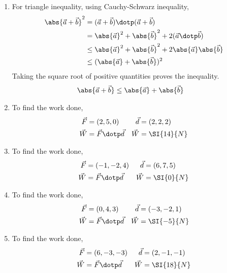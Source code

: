 \begin{enumerate}
    \item For triangle inequality, using Cauchy-Schwarz inequality,
          \begin{align}
              \abs{\vec{a} + \vec{b}}^2 & = (\vec{a} + \vec{b}) \dotp
              (\vec{a} + \vec{b})                                                \\
                                        & = \abs{\vec{a}}^2 + \abs{\vec{b}}^2
              + 2 (\vec{a} \dotp \vec{b})                                        \\
                                        & \leq \abs{\vec{a}}^2 + \abs{\vec{b}}^2
              + 2 \abs{\vec{a}}\abs{\vec{b}}                                     \\
                                        & \leq (\abs{\vec{a}} + \abs{\vec{b}})^2
          \end{align}
          Taking the square root of positive quantities proves the inequality.
          \begin{align}
              \abs{\vec{a} + \vec{b}} & \leq \abs{\vec{a}} + \abs{\vec{b}}
          \end{align}

    \item To find the work done,
          \begin{align}
              \vec{F} & = (2, 5, 0)             & \vec{d} & = (2, 2, 2)  \\
              \vec{W} & = \vec{F} \dotp \vec{d} & \vec{W} & = \SI{14}{N}
          \end{align}

    \item To find the work done,
          \begin{align}
              \vec{F} & = (-1, -2, 4)           & \vec{d} & = (6, 7, 5) \\
              \vec{W} & = \vec{F} \dotp \vec{d} & \vec{W} & = \SI{0}{N}
          \end{align}

    \item To find the work done,
          \begin{align}
              \vec{F} & = (0, 4, 3)             & \vec{d} & = (-3, -2, 1) \\
              \vec{W} & = \vec{F} \dotp \vec{d} & \vec{W} & = \SI{-5}{N}
          \end{align}

    \item To find the work done,
          \begin{align}
              \vec{F} & = (6, -3, -3)           & \vec{d} & = (2, -1, -1) \\
              \vec{W} & = \vec{F} \dotp \vec{d} & \vec{W} & = \SI{18}{N}
          \end{align}


\end{enumerate}
